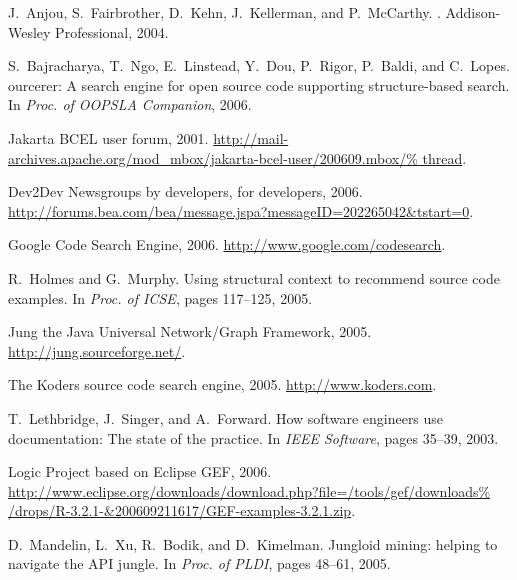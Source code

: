 \documentclass{fp035-thummalapenta}
\begin{document}
%

\begin{thebibliography}{10}

J.~Anjou, S.~Fairbrother, D.~Kehn, J.~Kellerman, and P.~McCarthy.
.
\newblock Addison-Wesley Professional, 2004.

S.~Bajracharya, T.~Ngo, E.~Linstead, Y.~Dou, P.~Rigor, P.~Baldi, and C.~Lopes.
ourcerer: A search engine for open source code supporting
  structure-based search.
\newblock In {\em Proc. of OOPSLA Companion}, 2006.

{J}akarta {BCEL} user forum, 2001.
\newblock
  \url{http://mail-archives.apache.org/mod_mbox/jakarta-bcel-user/200609.mbox/%
thread}.

Dev2{D}ev {N}ewsgroups by developers, for developers, 2006.
\newblock
  \url{http://forums.bea.com/bea/message.jspa?messageID=202265042&tstart=0}.

Google {C}ode {S}earch {E}ngine, 2006.
\newblock \url{http://www.google.com/codesearch}.

R.~Holmes and G.~Murphy.
\newblock Using structural context to recommend source code examples.
\newblock In {\em Proc. of ICSE}, pages 117--125, 2005.

Jung the {J}ava {U}niversal {N}etwork/{G}raph {F}ramework, 2005.
\newblock \url{http://jung.sourceforge.net/}.

The {K}oders source code search engine, 2005.
\newblock \url{http://www.koders.com}.

T.~Lethbridge, J.~Singer, and A.~Forward.
\newblock How software engineers use documentation: The state of the practice.
\newblock In {\em IEEE Software}, pages 35--39, 2003.

{L}ogic {P}roject based on {E}clipse {G}{E}{F}, 2006.
\newblock
  \url{http://www.eclipse.org/downloads/download.php?file=/tools/gef/downloads%
/drops/R-3.2.1-&200609211617/GEF-examples-3.2.1.zip}.

D.~Mandelin, L.~Xu, R.~Bodik, and D.~Kimelman.
\newblock Jungloid mining: helping to navigate the {API} jungle.
\newblock In {\em Proc. of PLDI}, pages 48--61, 2005.


\end{thebibliography}
\end{document}
